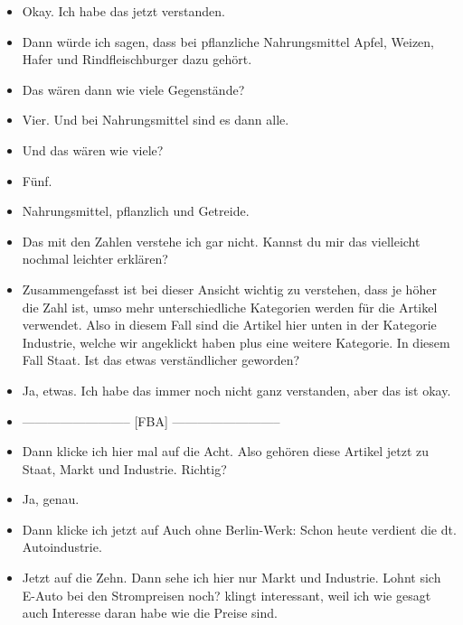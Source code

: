 {\begin{itemize}[]
                  Beim Rindfleischburger konsumieren wir sowohl das Fleisch als tierisches Nahrungsmittel als auch das Brötchen als pflanzliches Nahrungsmittel.
            \item {} Okay. Ich habe das jetzt verstanden.
            \item {} Dann würde ich sagen, dass bei pflanzliche Nahrungsmittel Apfel, Weizen, Hafer und Rindfleischburger dazu gehört.
            \item {} Das wären dann wie viele Gegenstände?
            \item {} Vier. Und bei Nahrungsmittel sind es dann alle.
            \item {} Und das wären wie viele?
            \item {} Fünf.
            \item {} Nahrungsmittel, pflanzlich und Getreide.
            \item {} Das mit den Zahlen verstehe ich gar nicht.
                  Kannst du mir das vielleicht nochmal leichter erklären?
            \item {} Zusammengefasst ist bei dieser Ansicht wichtig zu verstehen, dass je höher die Zahl ist, umso mehr unterschiedliche Kategorien werden für die Artikel verwendet.
                  Also in diesem Fall sind die Artikel hier unten in der Kategorie Industrie, welche wir angeklickt haben plus eine weitere Kategorie.
                  In diesem Fall Staat.
                  Ist das etwas verständlicher geworden?
            \item {} Ja, etwas.
                  Ich habe das immer noch nicht ganz verstanden, aber das ist okay.
            \item {--------------------------} [FBA] {--------------------------}
            \item {} Dann klicke ich hier mal auf die Acht.
                  Also gehören diese Artikel jetzt zu Staat, Markt und Industrie. Richtig?
            \item {} Ja, genau.
            \item {} Dann klicke ich jetzt auf \flqq Auch ohne Berlin-Werk: Schon heute verdient die dt. Autoindustrie\frqq{}.
            \item {} Jetzt auf die Zehn.
                  Dann sehe ich hier nur Markt und Industrie.
                  \flqq Lohnt sich E-Auto bei den Strompreisen noch?\frqq{} klingt interessant, weil ich wie gesagt auch Interesse daran habe wie die Preise sind.

\end{itemize}}
